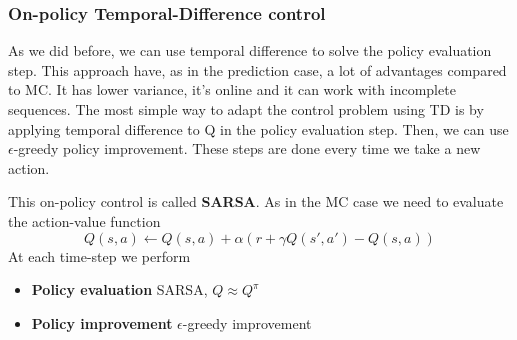 \documentclass[../main.tex]{subfiles}
\begin{document}
\subsubsection{On-policy Temporal-Difference control}
As we did before, we can use temporal difference to solve the policy evaluation step. This approach have, as in the prediction case, a lot of advantages compared to MC. It has lower variance, it's online and it can work with incomplete sequences.
The most simple way to adapt the control problem using TD is by applying temporal difference to Q in the policy evaluation step. Then, we can use $\epsilon$-greedy policy improvement. These steps are done every time we take a new action.
\par \noindent
This on-policy control is called \textbf{SARSA}\footnotemark. As in the MC case we need to evaluate the action-value function
\begin{equation*}
    Q(s,a) \leftarrow Q(s,a) + \alpha(r + \gamma Q(s',a') - Q(s,a))
\end{equation*}
At each time-step we perform
\begin{itemize}
    \item \textbf{Policy evaluation} SARSA, $Q \approx Q^{\pi}$
    \item \textbf{Policy improvement} $\epsilon$-greedy improvement
\end{itemize}
\end{document}
